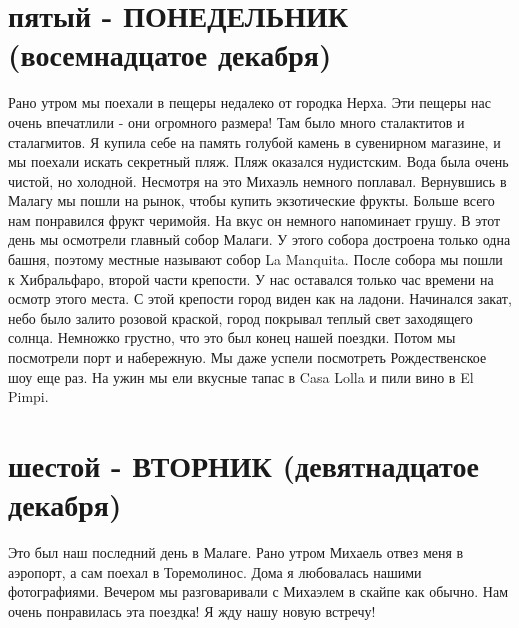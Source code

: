 \documentclass[a4paper]{article}
\begin{document}
\section{пятый - ПОНЕДЕЛЬНИК (восемнадцатое декабря)}
Рано утром мы поехали в пещеры недалеко от городка Нерха. Эти пещеры нас очень впечатлили - они огромного размера! Там было много сталактитов и сталагмитов. Я купила себе на память голубой камень в сувенирном магазине, и мы поехали искать секретный пляж. Пляж оказался нудистским. Вода была очень чистой, но холодной. Несмотря на это Михаэль немного поплавал. Вернувшись в Малагу мы пошли на рынок, чтобы купить экзотические фрукты. Больше всего нам понравился фрукт черимойя. На вкус он немного напоминает грушу.  В этот день мы осмотрели главный собор Малаги. У этого собора достроена только одна башня, поэтому местные называют собор La Manquita. После собора мы пошли к Хибральфаро, второй части крепости. У нас оставался только час времени на осмотр этого места. С этой крепости город виден как на ладони. Начинался закат, небо было залито розовой краской, город покрывал теплый свет заходящего солнца. Немножко грустно, что это был конец нашей поездки. Потом мы посмотрели порт и набережную. Мы даже успели посмотреть Рождественское шоу еще раз. На ужин мы ели вкусные тапас в Casa Lolla и пили вино в El Pimpi.

\section{шестой - ВТОРНИК (девятнадцатое декабря)}

Это был наш последний день в Малаге. Рано утром Михаель отвез меня в аэропорт, а сам поехал в Торемолинос. Дома я любовалась нашими фотографиями. Вечером мы разговаривали с Михаэлем в скайпе как обычно. Нам очень понравилась эта поездка! Я жду нашу новую встречу!
\end{document}
